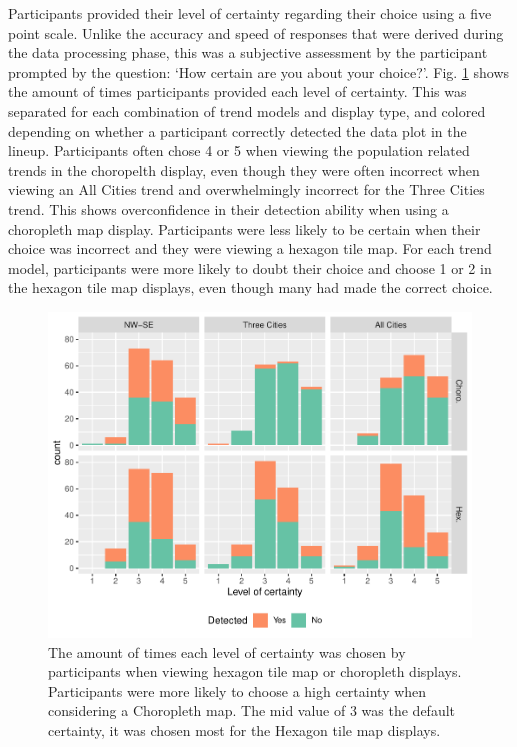 \documentclass[conference,final,]{IEEEtran}
\begin{document}
Participants provided their level of certainty regarding their choice using a five point scale.
Unlike the accuracy and speed of responses that were derived during the data processing phase, this was a subjective
assessment by the participant prompted by the question: `How certain are you about your choice?'.
Fig. \ref{fig:certainty} shows the amount of times participants provided each level of certainty. This was separated for each combination of trend models and display type, and colored depending on whether a participant correctly detected the data plot in the lineup.
Participants often chose 4 or 5 when viewing the population related trends in the choropelth display, even though they were often incorrect when viewing an All Cities trend and overwhelmingly incorrect for the Three Cities trend. This shows overconfidence in their detection ability when using a choropleth map display. Participants were less likely to be certain when their choice was incorrect and they were viewing a hexagon tile map.
For each trend model, participants were more likely to doubt their choice and choose 1 or 2 in the hexagon tile map displays, even though many had made the correct choice.

\begin{figure}
\includegraphics[width=1\linewidth]{paper_files/figure-latex/certainty-1} \caption{The amount of times each level of certainty was chosen by participants when viewing hexagon tile map or choropleth displays. Participants were more likely to choose a high certainty when considering a Choropleth map. The mid value of 3 was the default certainty, it was chosen most for the Hexagon tile map displays.}\label{fig:certainty}
\end{figure}
\end{document}
